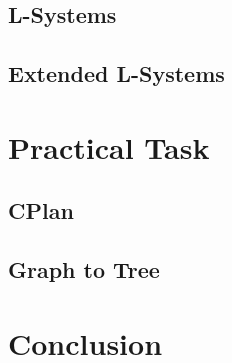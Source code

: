 \documentclass[11pt, a4paper]{report}
\begin{document}
\section{L-Systems}

\section{Extended L-Systems} 


\chapter{Practical Task} 

\section{CPlan}

\section{Graph to Tree}


\chapter{Conclusion}


\appendix
\glsaddall
\printglossaries
\end{document}

